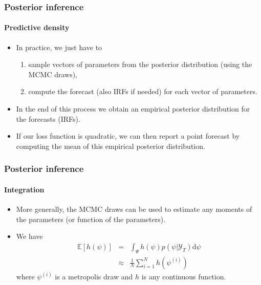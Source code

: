 \documentclass[10pt,slidestop]{beamer}
\newcommand{\sample}{\mathcal Y_T}
\begin{document}
\begin{frame}
  \frametitle{Posterior inference}
  \framesubtitle{Predictive density}

    \begin{itemize}

  \item In practice, we just have to
    {\small
    \begin{enumerate}
    \item sample vectors of parameters from
      the posterior distribution (using the MCMC draws),
    \item compute the forecast (also IRFs if needed) for each
      vector of parameters.
    \end{enumerate}}

\bigskip

   \item In the end of this process we obtain an empirical posterior
     distribution for the forecasts (IRFs).

\bigskip

   \item If our loss function is quadratic, we can then report a point
     forecast by computing the mean of this empirical posterior distribution.
\end{itemize}

\end{frame}


\begin{frame}
  \frametitle{Posterior inference}
  \framesubtitle{Integration}

  \begin{itemize}

    \item More generally, the MCMC draws can be used to estimate any moments
    of the parameters (or function of the parameters).

    \bigskip

    \item We have
    \begin{eqnarray*}
        \mathbb E\left[h(\psi)\right] &=&
\int_{\Psi}h(\psi)p(\psi|\sample)\mathrm d\psi\\
        &\approx& \frac{1}{N}\sum_{i=1}^Nh\left(\psi^{(i)}\right)
    \end{eqnarray*}
    where $\psi^{(i)}$ is a metropolis draw and $h$ is any continuous function.
  \end{itemize}
\end{frame}
\end{document}

